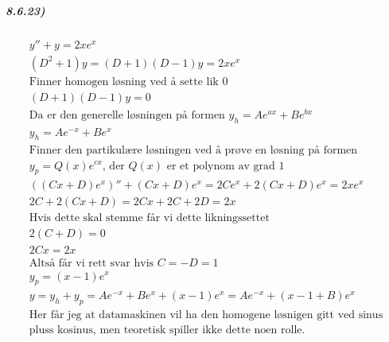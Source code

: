 \documentclass[11pt, A4paper,norsk]{article}
\begin{document}
			\subparagraph{8.6.23)}
				\begin{gather*}
y'' + y = 2xe^{x} \\
(D^2 + 1) y = (D + 1)(D - 1) y = 2xe^{x} \\
\text{Finner homogen løsning ved å sette lik $0$} \\
(D + 1)(D - 1) y = 0 \\
\text{Da er den generelle løsningen på formen $y_h = A e^{ax} + B e^{bx}$} \\
y_h = A e^{-x} + Be^{x} \\
\text{Finner den partikulære løsningen ved å prøve en løsning på formen} \\
\text{$y_p = Q(x) e^{cx}$, der $Q(x)$ er et polynom av grad $1$} \\
((Cx + D) e^{x})'' + (Cx + D) e^{x} = 2C e^{x} + 2(Cx + D)e^{x} = 2xe^{x} \\
2C + 2(Cx + D) = 2Cx + 2C + 2D = 2x \\
\text{Hvis dette skal stemme får vi dette likningssettet} \\
2(C + D) = 0 \\
2Cx = 2x \\
\text{Altså får vi rett svar hvis $C = - D = 1$} \\
y_p = (x - 1) e^{x} \\
y = y_h + y_p = A e^{-x} + Be^{x} + (x - 1) e^{x} = A e^{-x} + (x - 1 + B) e^{x} \\
\text{Her får jeg at datamaskinen vil ha den homogene løsnigen gitt ved sinus} \\
\text{pluss kosinus, men teoretisk spiller ikke dette noen rolle.}
				\end{gather*}
			
\end{document}
